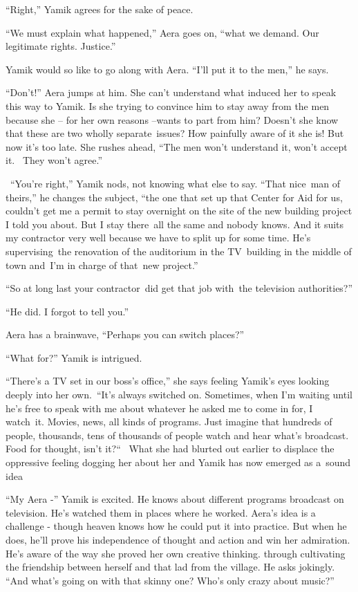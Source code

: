 \documentclass[twoside,11pt]{book}
\begin{document}
``Right,'' Yamik agrees for the sake of peace.

``We must explain what happened,'' Aera goes on, ``what we demand. Our legitimate rights.
Justice.'' 

Yamik would so like to go along with Aera. ``I'll put it to the men,'' he says.

``Don't!'' Aera jumps at him. She can't understand what induced her to speak this way to
Yamik. Is she trying to convince him to stay away from the men because she -- for her own reasons --wants to part from
him? Doesn't she know that these are two wholly separate\ issues? How painfully aware of it she is! But now it's too
late. She rushes ahead, ``The men won't understand it, won't accept it.~ They won't agree.'' 

~``You're right,'' Yamik nods, not knowing what else to say. ``That nice\ man of
theirs,'' he changes the subject, ``the one that set up that Center for Aid for us, couldn't get me a permit to stay
overnight on the site of the new building project I told you about. But I stay there~all the same and nobody knows. And
it suits my contractor very well because we have to split up for some time. He's supervising~the renovation of the
auditorium in the TV~building in the middle of town and~I'm in charge of that~new project.'' 

``So at long last your contractor~did get that job with~the television authorities?'' 

``He did. I forgot to tell you.'' 

Aera has a brainwave, ``Perhaps you can switch places?'' 

``What for?'' Yamik is intrigued.

``There's a TV set in our boss's office,'' she says feeling Yamik's eyes looking deeply into
her own.\  ``It's always switched on. Sometimes, when I'm waiting until he's free to speak with me about
whatever he asked me to come in for, I watch~it. Movies, news, all kinds of programs. Just imagine that hundreds of
people, thousands, tens of thousands of people watch and hear what's broadcast. Food for thought, isn't
it?``~ What she had blurted out earlier to displace the oppressive feeling dogging her about her and Yamik
has now emerged as a\ sound idea

``My Aera -'' Yamik is excited. He knows about different programs broadcast on television.
He's watched them in places where he worked. Aera's idea is a challenge - though heaven knows how he could put it into
practice. But when he does, he'll prove his independence of thought and action and win her admiration. He's aware of
the way she proved her own creative thinking{. }through cultivating the friendship between herself and
that lad from the village. He asks jokingly. ``And what's going on with that skinny one? Who's only crazy
about music?'' \ 
\end{document}
